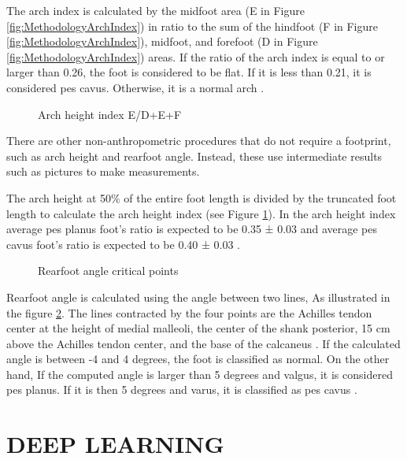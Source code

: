 The arch index is calculated by the midfoot area (E in Figure \ref{fig:MethodologyArchIndex}) in ratio to the sum of the hindfoot (F in Figure \ref{fig:MethodologyArchIndex}), midfoot, and forefoot (D in Figure \ref{fig:MethodologyArchIndex}) areas. If the ratio of the arch index is equal to or larger than 0.26, the foot is considered to be flat. If it is less than 0.21, it is considered pes cavus. Otherwise, it is a normal arch \cite{igbigbi2005arch}. 

\begin{figure}[htbp]
\centering
{}
\caption{Arch height index E/D+E+F \cite{miller2014effect}}
\label{fig:MethodologyArchHeightIndex}
\end{figure}

There are other non-anthropometric procedures that do not require a footprint, such as arch height and rearfoot angle. Instead, these use intermediate results such as pictures to make measurements.

The arch height at 50\% of the entire foot length is divided by the truncated foot length to calculate the arch height index (see Figure \ref{fig:MethodologyArchHeightIndex}). In the arch height index average pes planus foot’s ratio is expected to be 0.35 ± 0.03 and average pes cavus foot’s ratio is expected to be 0.40 ± 0.03 \cite{hillstrom2013foot}.

\begin{figure}[htbp]
\centering
{}
\caption{Rearfoot angle critical points \cite{langley2016clinical}}
\label{fig:MethodologyRearfootAngle}
\end{figure}

Rearfoot angle is calculated using the angle between two lines, As illustrated in the figure \ref{fig:MethodologyRearfootAngle}. The lines contracted by the four points are the Achilles tendon center at the height of medial malleoli, the center of the shank posterior, 15 cm above the Achilles tendon center, and the base of the calcaneus \cite{huerta2008relationship}. If the calculated angle is between -4 and 4 degrees, the foot is classified as normal. On the other hand, If the computed angle is larger than 5 degrees and valgus, it is considered pes planus. If it is then 5 degrees and varus, it is classified as pes cavus \cite{jonson1997intraexaminer}.

\section{DEEP LEARNING}

